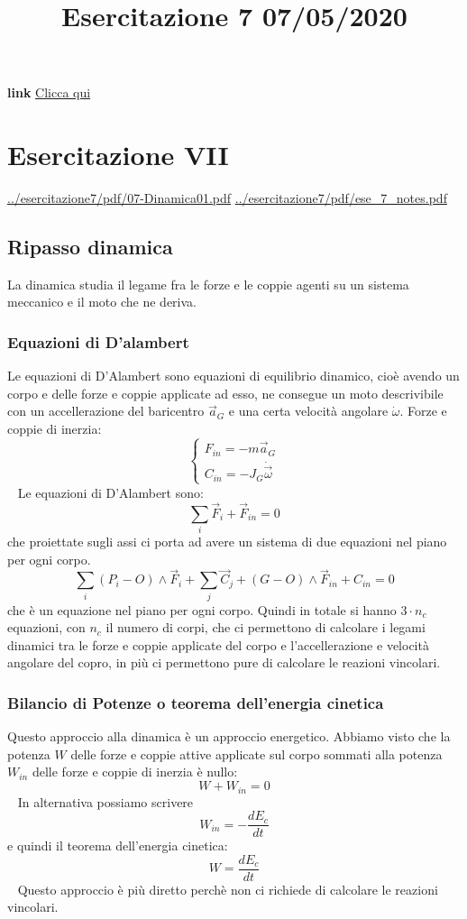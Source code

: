 \title{Esercitazione 7 07/05/2020}\newline
\textbf{link} \href{https://web.microsoftstream.com/video/0b9f9350-a8e9-4502-8400-a731263975b5}{Clicca qui}
\section{Esercitazione VII}
\url{../esercitazione7/pdf/07-Dinamica01.pdf}\newline
\url{../esercitazione7/pdf/ese_7_notes.pdf}
\subsection{Ripasso dinamica}
La dinamica studia il legame fra le forze e le coppie agenti su un sistema meccanico e il moto che ne deriva.
\subsubsection{Equazioni di D'alambert}
Le equazioni di D'Alambert sono equazioni di equilibrio dinamico, cioè avendo un corpo e delle forze e coppie applicate ad esso, ne consegue un moto descrivibile con un accellerazione del baricentro $\vec{a}_G$ e una certa velocità angolare $\dot{\omega}$.\newline
\newline
Forze e coppie di inerzia:
\[
    \begin{cases}
        F_{in} = -m \vec{a}_G\\
        C_{in} = - J_G \dot{\vec{\omega}}
    \end{cases}
\]
\ \newline
Le equazioni di D'Alambert sono:
\[
    \sum_i \vec{F}_i + \vec{F}_{in} = 0
\]
che proiettate sugli assi ci porta ad avere un sistema di due equazioni nel piano per ogni corpo.
\[
    \sum_i (P_i - O) \land \vec{F}_i + \sum_j \vec{C}_j + (G-O) \land \vec{F}_{in} + C_{in} = 0
\]
che è un equazione nel piano per ogni corpo.\newline
Quindi in totale si hanno $3 \cdot n_c$ equazioni, con $n_c$ il numero di corpi, che ci permettono di calcolare i legami dinamici tra le forze e coppie applicate del corpo e l'accellerazione e velocità angolare del copro, in più ci permettono pure di calcolare le reazioni vincolari.
\subsubsection{Bilancio di Potenze o teorema dell'energia cinetica}
Questo approccio alla dinamica è un approccio energetico.\newline
\newline
Abbiamo visto che la potenza $W$ delle forze e coppie attive applicate sul corpo sommati alla potenza $W_{in}$ delle forze e coppie di inerzia è nullo:
\[
    W + W_{in} = 0
\]
\ \newline
In alternativa possiamo scrivere
\[
    W_{in} = - \frac{d E_c}{dt}
\]
e quindi il teorema dell'energia cinetica:
\[
    W = \frac{d E_c}{dt}
\]
\ \newline
Questo approccio è più diretto perchè non ci richiede di calcolare le reazioni vincolari.